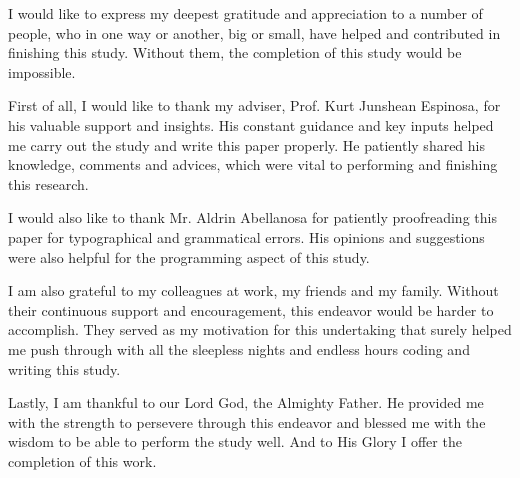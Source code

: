 \begin{acknowledgements}
I would like to express my deepest gratitude and appreciation to a number of
people, who in one way or another, big or small, have helped and contributed in
finishing this study. Without them, the completion of this study would be
impossible.

First of all, I would like to thank my adviser, Prof. Kurt Junshean Espinosa,
for his valuable support and insights. His constant guidance and key inputs
helped me carry out the study and write this paper properly. He patiently
shared his knowledge, comments and advices, which were vital to performing and
finishing this research.

I would also like to thank Mr. Aldrin Abellanosa for patiently proofreading this
paper for typographical and grammatical errors. His opinions and suggestions
were also helpful for the programming aspect of this study.

I am also grateful to my colleagues at work, my friends and my family. Without
their continuous support and encouragement, this endeavor would be harder to accomplish.
They served as my motivation for this undertaking that surely helped me push through
with all the sleepless nights and endless hours coding and writing this study.

Lastly, I am thankful to our Lord God, the Almighty Father. He provided me with
the strength to persevere through this endeavor and blessed me with the wisdom
to be able to perform the study well. And to His Glory I offer the completion
of this work.

\end{acknowledgements}
